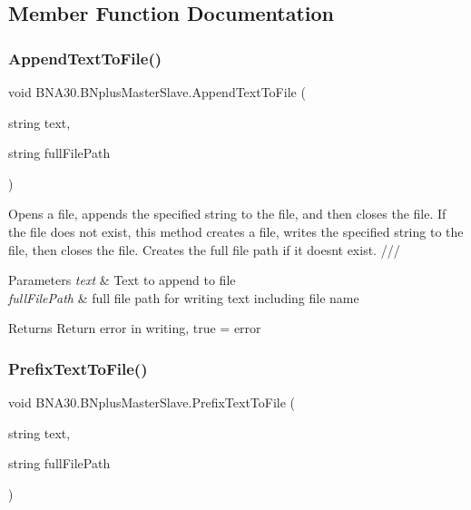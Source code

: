 \subsection{Member Function Documentation}
\mbox{\label{class_b_n_a30_1_1_b_nplus_master_slave_a8192fedb382985fa67387f75f164f41c}} 
\subsubsection{\texorpdfstring{AppendTextToFile()}{AppendTextToFile()}}
{\footnotesize\ttfamily void B\+N\+A30.\+B\+Nplus\+Master\+Slave.\+Append\+Text\+To\+File (\begin{DoxyParamCaption}\item[{string}]{text,  }\item[{string}]{full\+File\+Path }\end{DoxyParamCaption})\hspace{0.3cm}{\ttfamily [inline]}}



Opens a file, appends the specified string to the file, and then closes the file. If the file does not exist, this method creates a file, writes the specified string to the file, then closes the file. Creates the full file path if it doesn\textquotesingle{}t exist. /// 


\begin{DoxyParams}{Parameters}
{\em text} & Text to append to file\\
\hline
{\em full\+File\+Path} & full file path for writing text including file name\\
\hline
\end{DoxyParams}
\begin{DoxyReturn}{Returns}
Return error in writing, true = error 
\end{DoxyReturn}
\mbox{\label{class_b_n_a30_1_1_b_nplus_master_slave_aee1ab8ce47fbe22ba6a7fe6da4c31358}} 
\subsubsection{\texorpdfstring{PrefixTextToFile()}{PrefixTextToFile()}}
{\footnotesize\ttfamily void B\+N\+A30.\+B\+Nplus\+Master\+Slave.\+Prefix\+Text\+To\+File (\begin{DoxyParamCaption}\item[{string}]{text,  }\item[{string}]{full\+File\+Path }\end{DoxyParamCaption})\hspace{0.3cm}{\ttfamily [inline]}}






